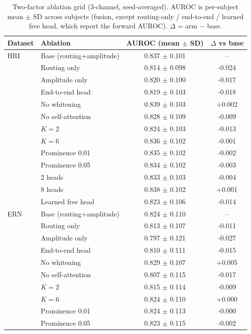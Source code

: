 \begin{table}[t]
\centering
\setlength{\tabcolsep}{6pt}
\caption{Two-factor ablation grid (3-channel, seed-averaged). AUROC is per-subject mean $\pm$ SD across subjects (fusion, except routing-only / end-to-end / learned free head, which report the forward AUROC). $\Delta$ = arm $-$ base.}
\label{sup:tab-ablation}
\begin{tabular}{llcc}
\toprule
Dataset & Ablation & AUROC (mean $\pm$ SD) & $\Delta$ vs base \\
\midrule
HRI & Base (routing+amplitude) & 0.837 $\pm$ 0.101 & -- \\
 & Routing only & 0.814 $\pm$ 0.098 & -0.024 \\
 & Amplitude only & 0.820 $\pm$ 0.100 & -0.017 \\
 & End-to-end head & 0.819 $\pm$ 0.103 & -0.018 \\
 & No whitening & 0.839 $\pm$ 0.103 & +0.002 \\
 & No self-attention & 0.828 $\pm$ 0.109 & -0.009 \\
 & $K=2$ & 0.824 $\pm$ 0.103 & -0.013 \\
 & $K=6$ & 0.836 $\pm$ 0.102 & -0.001 \\
 & Prominence 0.01 & 0.835 $\pm$ 0.102 & -0.002 \\
 & Prominence 0.05 & 0.834 $\pm$ 0.102 & -0.003 \\
 & 2 heads & 0.833 $\pm$ 0.103 & -0.004 \\
 & 8 heads & 0.838 $\pm$ 0.102 & +0.001 \\
 & Learned free head & 0.823 $\pm$ 0.106 & -0.014 \\
\midrule
ERN & Base (routing+amplitude) & 0.824 $\pm$ 0.110 & -- \\
 & Routing only & 0.813 $\pm$ 0.107 & -0.011 \\
 & Amplitude only & 0.797 $\pm$ 0.121 & -0.027 \\
 & End-to-end head & 0.810 $\pm$ 0.111 & -0.015 \\
 & No whitening & 0.829 $\pm$ 0.107 & +0.005 \\
 & No self-attention & 0.807 $\pm$ 0.115 & -0.017 \\
 & $K=2$ & 0.815 $\pm$ 0.114 & -0.009 \\
 & $K=6$ & 0.824 $\pm$ 0.110 & +0.000 \\
 & Prominence 0.01 & 0.824 $\pm$ 0.113 & -0.000 \\
 & Prominence 0.05 & 0.823 $\pm$ 0.115 & -0.002 \\

\end{tabular}
\end{table}
